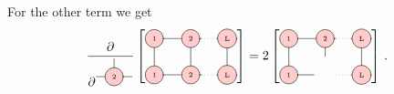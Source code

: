 \documentclass[twoside,twocolumn,9pt]{article}
\begin{document}
For the other term we get
\begin{equation}\label{eq:gradient-2}
  \pderivative{\begin{tikzpicture}
    \draw[gray, thick] (0,0) -- (1,0);
    \draw[gray, thick] (0.5,0) -- (0.5,0.5);
    \node[draw, circle, line cap=round, fill=red!20] at (0.5,0) {\tiny 2};
  \end{tikzpicture}} \left[ \begin{tikzpicture}[baseline={([yshift=-.5ex]current bounding box.center)}]
    \draw[gray, thick] (0,0) -- (0,-1);
    \draw[gray, thick] (1,0) -- (1,-1);
    \draw[gray, thick] (2,0) -- (2,-1);

    \draw[gray, thick] (0,0) -- (1.3,0);
    \draw[gray, dotted] (1.3,0) -- (1.7,0);
    \draw[gray, thick] (1.7,0) -- (2.0,0);

    \draw[gray, thick] (0,-1) -- (1.3,-1);
    \draw[gray, dotted] (1.3,-1) -- (1.7,-1);
    \draw[gray, thick] (1.7,-1) -- (2.0,-1);

    \node[draw, circle, line cap=round, fill=red!20] at (0,0) {\tiny 1};
    \node[draw, circle, line cap=round, fill=red!20] at (1,0) {\tiny 2};
    \node[draw, circle, line cap=round, fill=red!20] at (2,0) {\tiny L};

    \node[draw, circle, line cap=round, fill=red!20] at (0,-1) {\tiny 1};
    \node[draw, circle, line cap=round, fill=red!20] at (1,-1) {\tiny 2};
    \node[draw, circle, line cap=round, fill=red!20] at (2,-1) {\tiny L};    
  \end{tikzpicture} \right] = 2 \left[
  \begin{tikzpicture}[baseline={([yshift=-.5ex]current bounding box.center)}]
    \draw[gray, thick] (0,0) -- (0,-1);
    \draw[gray, thick] (1,0) -- (1,-0.5);
    \draw[gray, thick] (2,0) -- (2,-1);

    \draw[gray, thick] (0,0) -- (1.3,0);
    \draw[gray, dotted] (1.3,0) -- (1.7,0);
    \draw[gray, thick] (1.7,0) -- (2.0,0);

    \draw[gray, thick] (0,-1) -- (0.7,-1);
    \draw[gray, dotted] (1.3,-1) -- (1.7,-1);
    \draw[gray, thick] (1.7,-1) -- (2.0,-1);

    \node[draw, circle, line cap=round, fill=red!20] at (0,0) {\tiny 1};
    \node[draw, circle, line cap=round, fill=red!20] at (1,0) {\tiny 2};
    \node[draw, circle, line cap=round, fill=red!20] at (2,0) {\tiny L};

    \node[draw, circle, line cap=round, fill=red!20] at (0,-1) {\tiny 1};
    \node[draw, circle, line cap=round, fill=red!20] at (2,-1) {\tiny L};
  \end{tikzpicture} \right] \thinspace .
\end{equation}
\end{document}
